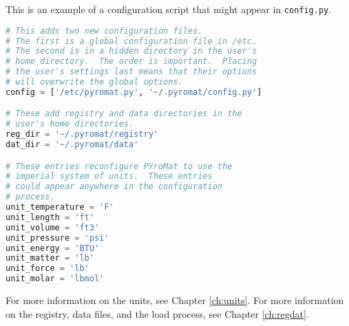 This is an example of a configuration script that might appear in \verb|config.py|.

\begin{lstlisting}[language=Python]
# This adds two new configuration files. 
# The first is a global configuration file in /etc.
# The second is in a hidden directory in the user's
# home directory.  The order is important.  Placing
# the user's settings last means that their options
# will overwrite the global options.
config = ['/etc/pyromat.py', '~/.pyromat/config.py']

# These add registry and data directories in the 
# user's home directories.
reg_dir = '~/.pyromat/registry'
dat_dir = '~/.pyromat/data'

# These entries reconfigure PYroMat to use the 
# imperial system of units.  These entries 
# could appear anywhere in the configuration 
# process.
unit_temperature = 'F'
unit_length = 'ft'
unit_volume = 'ft3'
unit_pressure = 'psi'
unit_energy = 'BTU'
unit_matter = 'lb'
unit_force = 'lb'
unit_molar = 'lbmol'
\end{lstlisting}

For more information on the units, see Chapter \ref{ch:units}.  For more information on the registry, data files, and the load process, see Chapter \ref{ch:regdat}.

